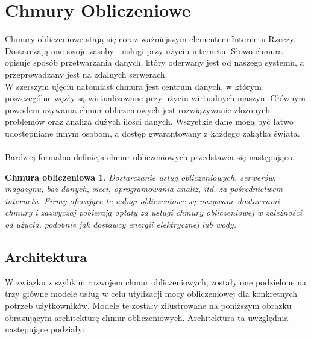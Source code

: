 \documentclass[12pt]{report}
\let\Oldsection\section
\renewcommand{\section}{\FloatBarrier\Oldsection}
\let\Oldsubsection\subsection
\renewcommand{\subsection}{\FloatBarrier\Oldsubsection}
\newtheorem{cloudcomputing}{Chmura obliczeniowa}
\begin{document}
\section{Chmury Obliczeniowe}
Chmury obliczeniowe stają się coraz ważniejszym elementem Internetu Rzeczy. Dostarczają one swoje zasoby i usługi przy użyciu internetu. Słowo chmura opisuje sposób przetwarzania danych, który oderwany jest od naszego systemu, a przeprowadzany jest na zdalnych serwerach. \\
\indent W szerszym ujęciu natomiast chmura jest centrum danych, w którym poszczególne węzły są wirtualizowane przy użyciu wirtualnych maszyn. Głównym powodem używania chmur obliczeniowych jest rozwiązywanie złożonych problemów oraz analiza dużych ilości danych. Wszystkie dane mogą być łatwo udostępniane innym osobom, a dostęp gwarantowany z każdego zakątka świata. \\ \\
Bardziej formalna definicja chmur obliczeniowych przedstawia się następująco.
\begin{cloudcomputing}
Dostarczanie usług obliczeniowych, serwerów, magazynu, baz danych, sieci, oprogramowania analiz, itd. za pośrednictwem internetu. Firmy oferujące te usługi obliczeniowe są nazywane dostawcami chmury i zazwyczaj pobie\-rają opłaty za usługi chmury obliczeniowej w zależności od użycia, podobnie jak dostawcy energii elektrycznej lub wody.
\end{cloudcomputing}

\subsection{Architektura}
W związku z szybkim rozwojem chmur obliczeniowych, zostały one podzielone na trzy główne modele usług w celu utylizacji mocy obliczeniowej dla konkretnych potrzeb użytkowników. Modele te zostały zilustrowane na poniższym obrazku obrazującym architekturę chmur obliczeniowych. Architektura ta uwzględnia następujące podziały:
\end{document}
